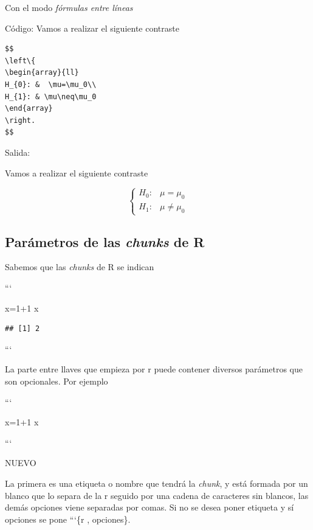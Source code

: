 \documentclass[]{article}
\newenvironment{Shaded}{\begin{snugshade}}{\end{snugshade}}
\newcommand{\DecValTok}[1]{\textcolor[rgb]{0.00,0.00,0.81}{{#1}}}
\newcommand{\NormalTok}[1]{{#1}}
\begin{document}
Con el modo \emph{fórmulas entre líneas}

Código: Vamos a realizar el siguiente contraste

\begin{verbatim}
$$
\left\{
\begin{array}{ll}
H_{0}: &  \mu=\mu_0\\
H_{1}: & \mu\neq\mu_0
\end{array}
\right.
$$
\end{verbatim}

Salida:

Vamos a realizar el siguiente contraste

\[
\left\{
\begin{array}{ll}
H_{0}: &  \mu=\mu_0\\
H_{1}: & \mu\neq\mu_0
\end{array}
\right.
\]

\subsection{Parámetros de las \emph{chunks} de R
}\label{parametros-de-las-chunks-de-r}

Sabemos que las \emph{chunks} de R se indican

```

\begin{Shaded}
\begin{Highlighting}[]
\NormalTok{x=}\DecValTok{1+1}  
\NormalTok{x }
\end{Highlighting}
\end{Shaded}

\begin{verbatim}
## [1] 2
\end{verbatim}

```

La parte entre llaves que empieza por r puede contener diversos
parámetros que son opcionales. Por ejemplo

```

\begin{Shaded}
\begin{Highlighting}[]
\NormalTok{x=}\DecValTok{1+1}  
\NormalTok{x}
\end{Highlighting}
\end{Shaded}

```

NUEVO

La primera es una etiqueta o nombre que tendrá la \emph{chunk}, y está
formada por un blanco que lo separa de la r seguido por una cadena de
caracteres sin blancos, las demás opciones viene separadas por comas. Si
no se desea poner etiqueta y sí opciones se pone ```\{r , opciones\}.
\end{document}
